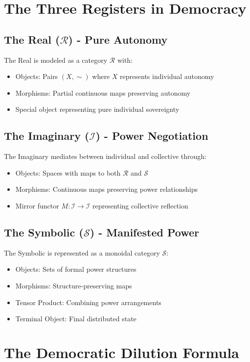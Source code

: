 \documentclass[12pt]{article}
\theoremstyle{plain}
\begin{document}
\section{The Three Registers in Democracy}

\subsection{The Real ($\mathcal{R}$) - Pure Autonomy}
The Real is modeled as a category $\mathcal{R}$ with:
\begin{itemize}
    \item Objects: Pairs $(X,\sim)$ where $X$ represents individual autonomy
    \item Morphisms: Partial continuous maps preserving autonomy
    \item Special object representing pure individual sovereignty
\end{itemize}

\subsection{The Imaginary ($\mathcal{I}$) - Power Negotiation}
The Imaginary mediates between individual and collective through:
\begin{itemize}
    \item Objects: Spaces with maps to both $\mathcal{R}$ and $\mathcal{S}$
    \item Morphisms: Continuous maps preserving power relationships
    \item Mirror functor $M: \mathcal{I} \to \mathcal{I}$ representing collective reflection
\end{itemize}

\subsection{The Symbolic ($\mathcal{S}$) - Manifested Power}
The Symbolic is represented as a monoidal category $\mathcal{S}$:
\begin{itemize}
    \item Objects: Sets of formal power structures
    \item Morphisms: Structure-preserving maps
    \item Tensor Product: Combining power arrangements
    \item Terminal Object: Final distributed state
\end{itemize}

\section{The Democratic Dilution Formula}
\end{document}
